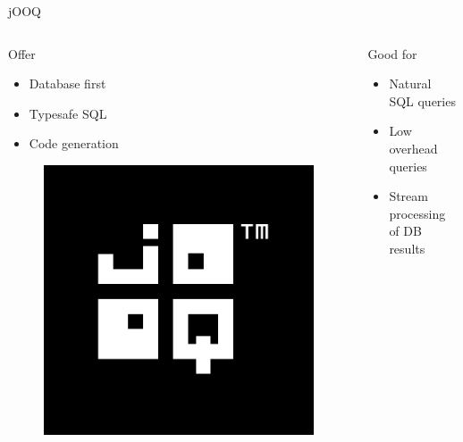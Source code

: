 \documentclass[14pt]{beamer}
\begin{document}
\begin{frame}[fragile]{jOOQ}
    \begin{columns}
        \begin{column}{0.5\textwidth}
            Offer
            \begin{itemize}
                \item Database first
                \item Typesafe SQL
                \item Code generation
            \end{itemize}
         \begin{figure}
            \centering
            \includegraphics[width=0.3\linewidth]{Images/jooq}
        \end{figure}
        \end{column}
        \begin{column}{0.5\textwidth}  %
            Good for
            \begin{itemize}
                \item Natural SQL queries
                \item Low overhead queries
                \item Stream processing of DB results
            \end{itemize}
        \end{column}
    \end{columns}
\end{frame}
\end{document}
